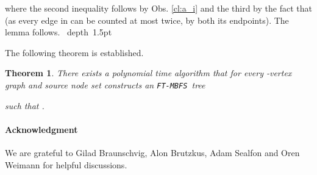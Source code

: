\documentclass[12pt]{article}
\newtheorem{theorem}{Theorem}[section]
\def\blackslug{\hbox{\hskip 1pt \vrule width 4pt height 8pt
    depth 1.5pt \hskip 1pt}}
\def\QED{\quad\blackslug\lower 8.5pt\null\par}
\def\FTMBFS{\mbox{\tt FT-MBFS}}
\begin{document}
where the second inequality follows by Obs. \ref{cl:a_i} and
the third by the fact that  (as every edge in  can be counted at most twice, by both its endpoints). The lemma follows.
\QED

The following theorem is established.

\begin{theorem}
\label{thm:edgeonef-approx}
There exists a polynomial time algorithm that for every -vertex graph 
and source node set  constructs an \FTMBFS\ tree

such that .
\end{theorem}



\bigskip
\paragraph{Acknowledgment}
We are grateful to Gilad Braunschvig, Alon Brutzkus, Adam Sealfon
and Oren Weimann for helpful discussions.

\clearpage
\end{document}
